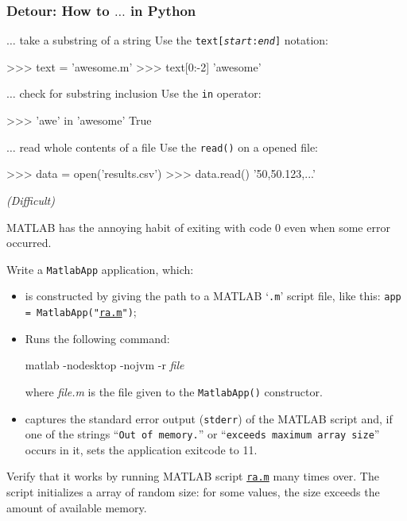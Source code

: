 \documentclass[english,serif,mathserif,xcolor=pdftex,dvipsnames,table]{beamer}
\begin{document}
\begin{frame}[fragile]
  \frametitle{Detour: How to $\ldots$ in Python}
  \small{}

  \begin{describe}{$\ldots$ take a substring of a string}
    Use the \texttt{text[\emph{start}:\emph{end}]} notation:
    \begin{python}
>>> text = 'awesome.m'
>>> text[0:-2]
'awesome'
    \end{python}
  \end{describe}

  \begin{describe}{$\ldots$ check for substring inclusion}
    Use the \lstinline|in| operator:
    \begin{python}
>>> 'awe' in 'awesome'
True
    \end{python}
  \end{describe}

  \begin{describe}{$\ldots$ read whole contents of a file}
    Use the \lstinline|read()| on a opened file:
    \begin{python}
>>> data = open('results.csv')
>>> data.read()
'50,50.123,...'
    \end{python}

  \end{describe}
\end{frame}


\begin{frame}[fragile]
  \begin{exercise*}[6.C] \emph{(Difficult)} \footnotesize

    MATLAB has the annoying habit of exiting with code 0 even when some error occurred.

    \+
    Write a \texttt{MatlabApp} application, which:
    \begin{itemize}
    \item is constructed by giving the path to a MATLAB `\texttt{.m}'
      script file, like this: \texttt{app = MatlabApp("\href{https://github.com/uzh/gc3pie/blob/master/docs/programmers/tutorials/workflows/downloads/ra.m}{ra.m}")};
    \item Runs the following command:
\begin{semiverbatim}
matlab -nodesktop -nojvm -r \emph{file}
\end{semiverbatim}
      where \emph{file.m} is the file given to the
      \texttt{MatlabApp()} constructor.
    \item captures the standard error output (\texttt{stderr}) of the MATLAB
      script and, if one of the strings ``\texttt{Out of memory.}'' or
      ``\texttt{exceeds maximum array size}'' occurs in it, sets the application
      exitcode to 11.
    \end{itemize}

    Verify that it works by running MATLAB script
    \href{https://github.com/uzh/gc3pie/blob/master/docs/programmers/tutorials/workflows/downloads/ra.m}{\texttt{ra.m}}
    many times over.  The script initializes a array of random size:
    for some values, the size exceeds the amount of available memory.
  \end{exercise*}
\end{frame}
\end{document}
